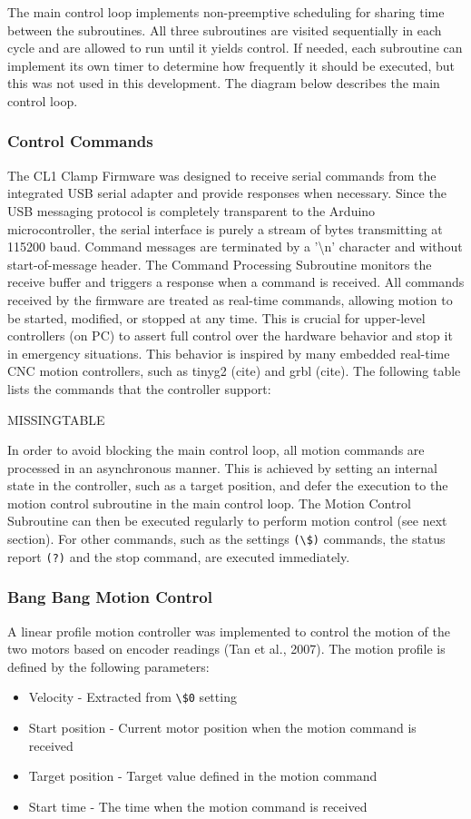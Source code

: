 The main control loop implements non-preemptive scheduling for sharing time between the subroutines. All three subroutines are visited sequentially in each cycle and are allowed to run until it yields control. If needed, each subroutine can implement its own timer to determine how frequently it should be executed, but this was not used in this development. The diagram below describes the main control loop.

\subsubsection{Control Commands}
The CL1 Clamp Firmware was designed to receive serial commands from the integrated USB serial adapter and provide responses when necessary. Since the USB messaging protocol is completely transparent to the Arduino microcontroller, the serial interface is purely a stream of bytes transmitting at 115200 baud. Command messages are terminated by a '\textbackslash n' character and without start-of-message header. The Command Processing Subroutine monitors the receive buffer and triggers a response when a command is received.
All commands received by the firmware are treated as real-time commands, allowing motion to be started, modified, or stopped at any time. This is crucial for upper-level controllers (on PC) to assert full control over the hardware behavior and stop it in emergency situations. This behavior is inspired by many embedded real-time CNC motion controllers, such as tinyg2 (cite) and grbl (cite).
The following table lists the commands that the controller support:

MISSINGTABLE

In order to avoid blocking the main control loop, all motion commands are processed in an asynchronous manner. This is achieved by setting an internal state in the controller, such as a target position, and defer the execution to the motion control subroutine in the main control loop. The Motion Control Subroutine can then be executed regularly to perform motion control (see next section).
For other commands, such as the settings \verb|(\$)| commands, the status report \verb|(?)| and the stop command, are executed immediately. 
\subsubsection{Bang Bang Motion Control}

A linear profile motion controller was implemented to control the motion of the two motors based on encoder readings (Tan et al., 2007). The motion profile is defined by the following parameters:
\begin{itemize}
    \item Velocity - Extracted from \verb|\$0| setting
    \item Start position - Current motor position when the motion command is received
    \item Target position - Target value defined in the motion command
    \item Start time - The time when the motion command is received
\end{itemize}

